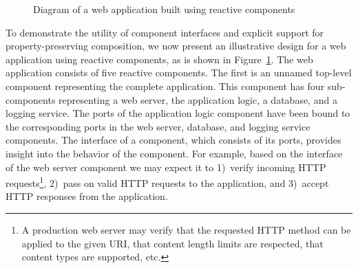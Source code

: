 \begin{figure}
\centering
{}%
\caption{Diagram of a web application built using reactive components\label{web_server}}
\end{figure}

To demonstrate the utility of component interfaces and explicit support for property-preserving composition, we now present an illustrative design for a web application using reactive components, as is shown in Figure~\ref{web_server}.
The web application consists of five reactive components.
The first is an unnamed top-level component representing the complete application.
This component has four sub-components representing a web server, the application logic, a database, and a logging service.
The ports of the application logic component have been bound to the corresponding ports in the web server, database, and logging service components.
The interface of a component, which consists of its ports, provides insight into the behavior of the component.
For example, based on the interface of the web server component we may expect it to 1)~verify incoming HTTP requests\footnote{A production web server may verify that the requested HTTP method can be applied to the given URI, that content length limits are respected, that content types are supported, etc.}, 2)~pass on valid HTTP requests to the application, and 3)~accept HTTP responses from the application.

